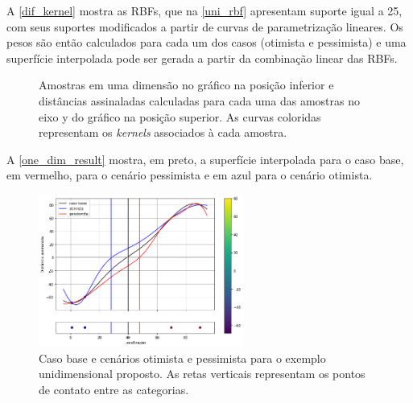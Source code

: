 A \autoref{dif_kernel} mostra as RBFs, que na \autoref{uni_rbf} apresentam suporte igual a 25, com seus suportes modificados a partir de curvas de parametrização lineares.  Os pesos são então calculados para cada um dos casos (otimista e pessimista) e uma superfície interpolada pode ser gerada a partir da combinação linear das RBFs.

\begin{figure}[H] 
    \centering
    \caption{Amostras em uma dimensão no gráfico na posição inferior e distâncias assinaladas calculadas para cada uma das amostras no eixo y do gráfico na posição superior. As curvas coloridas representam os \textit{kernels} associados à cada amostra.} \label{dif_kernel}
     \hspace{1em}
\end{figure}

A \autoref{one_dim_result} mostra, em preto, a superfície interpolada para o caso base, em vermelho, para o cenário pessimista e em azul para o cenário otimista. 
 
\begin{figure}[H]
	\caption{\label{one_dim_result} Caso base e cenários otimista e pessimista para o exemplo unidimensional proposto. As retas verticais representam os pontos de contato entre as categorias.}
	\centering
		\includegraphics[width=0.6\textwidth]{capitulo_3/imagens/all_kernels.png}
\end{figure}


